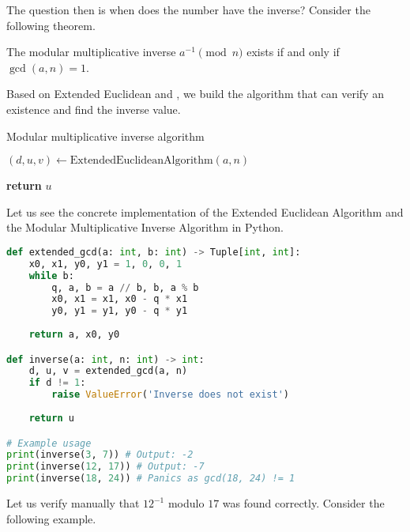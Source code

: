 \documentclass[../lecture-notes-148x210.tex]{subfiles}
\begin{document}
The question then is when does the number have the inverse? Consider the following theorem.

\begin{theorem}\label{th:inverse_existence}
    The modular multiplicative inverse $a^{-1} \pmod{n}$ exists if and only if $\gcd(a, n) = 1$.
\end{theorem}

Based on Extended Euclidean  and , we build the algorithm that can verify an existence and find the inverse value.

\begin{algorithm}[H]
    \caption{Modular multiplicative inverse algorithm} \label{alg:modular_inverse}
        
    $(d, u, v) \gets \text{ExtendedEuclideanAlgorithm}(a, n)$ 


    \textbf{return} $u$
\end{algorithm}

Let us see the concrete implementation of the Extended Euclidean Algorithm and
the Modular Multiplicative Inverse Algorithm in Python.
\begin{lstlisting}[language=Python]
def extended_gcd(a: int, b: int) -> Tuple[int, int]:
    x0, x1, y0, y1 = 1, 0, 0, 1
    while b:
        q, a, b = a // b, b, a % b
        x0, x1 = x1, x0 - q * x1
        y0, y1 = y1, y0 - q * y1
        
    return a, x0, y0

def inverse(a: int, n: int) -> int:
    d, u, v = extended_gcd(a, n)
    if d != 1:
        raise ValueError('Inverse does not exist')
    
    return u

# Example usage
print(inverse(3, 7)) # Output: -2
print(inverse(12, 17)) # Output: -7
print(inverse(18, 24)) # Panics as gcd(18, 24) != 1
\end{lstlisting}

Let us verify manually that $12^{-1}$ modulo $17$ was found correctly. Consider 
the following example.
\end{document}
